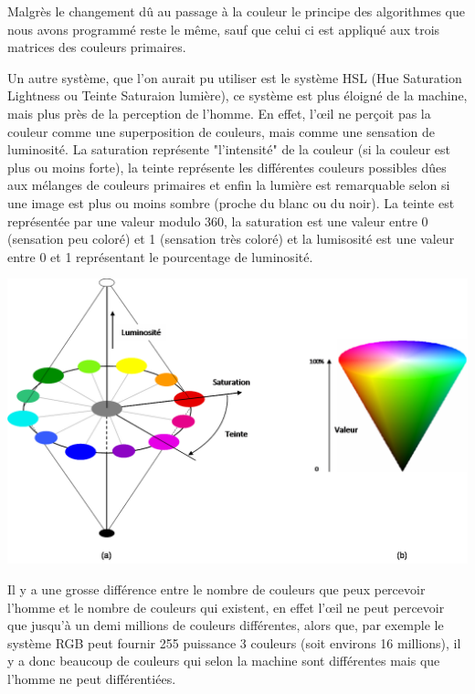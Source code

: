  
 Malgrès le changement dû au passage à la couleur le principe des algorithmes que nous avons programmé reste le même, sauf que celui ci est appliqué aux trois matrices des couleurs primaires.\newline
 
 
 Un autre système, que l'on aurait pu utiliser est le système HSL (Hue Saturation Lightness ou Teinte Saturaion lumière), ce système est plus éloigné de la machine, mais plus près de la perception de l'homme. En effet, l'œil ne perçoit pas la couleur comme une superposition de couleurs, mais comme une sensation de luminosité. La saturation représente "l'intensité" de la couleur (si la couleur est plus ou moins forte), la teinte représente les différentes couleurs possibles dûes aux mélanges de couleurs primaires et enfin la lumière est remarquable selon si une image est plus ou moins sombre (proche du blanc ou du noir). La teinte est représentée par une valeur modulo 360, la saturation est une valeur entre 0 (sensation peu coloré) et 1 (sensation très coloré) et la lumisosité est une valeur entre 0 et 1 représentant le pourcentage de luminosité.


 \includegraphics[scale=0.5]{Images/TSL.png}
 
 Il y a une grosse différence entre le nombre de couleurs que peux percevoir l'homme et le nombre de couleurs qui existent, en effet l'œil ne peut percevoir que jusqu'à un demi millions de couleurs différentes, alors que, par exemple le système RGB peut fournir 255 puissance 3 couleurs (soit environs 16 millions), il y a donc beaucoup de couleurs qui selon la machine sont différentes mais que l'homme ne peut différentiées.
